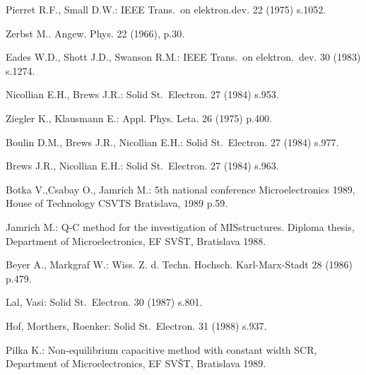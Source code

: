 \begin{thebibliography}{}

  Pierret R.F., Small D.W.: IEEE Trans.\ on elektron.dev. 22 (1975) s.1052.

  Zerbst M.. Angew. Phys. 22 (1966), p.30.

  Eades W.D., Shott J.D., Swanson R.M.: IEEE Trans.\ on elektron.\ dev. 30 (1983) s.1274.

  Nicollian E.H., Brews J.R.: Solid St.\ Electron.  27 (1984) s.953.

  Ziegler K., Klausmann E.: Appl. Phys. Leta. 26 (1975) p.400.

  Boulin D.M., Brews J.R., Nicollian E.H.: Solid St.\ Electron. 27 (1984) s.977.

  Brews J.R., Nicollian E.H.: Solid St.\ Electron. 27 (1984) s.963.

  Botka V.,Csabay O., Jamrich M.: 5th national conference Microelectronics 1989, House of Technology CSVTS Bratislava, 1989 p.59.

  Jamrich M.: Q-C method for the investigation of MIS\@ structures. Diploma thesis, Department of Microelectronics, EF SVŠT, Bratislava 1988.

  Beyer A., Markgraf W.: Wiss. Z. d. Techn. Hochsch. Karl-Marx-Stadt 28 (1986) p.479.

  Lal, Vasi: Solid St.\ Electron. 30 (1987) s.801.

  Hof, Morthers, Roenker: Solid St.\ Electron. 31 (1988) s.937.

  Pilka K.: Non-equilibrium capacitive method with constant width SCR, Department of Microelectronics, EF SVŠT, Bratislava 1989.

\end{thebibliography}
